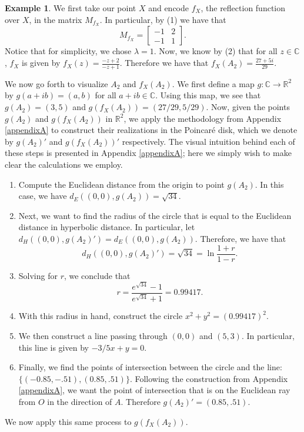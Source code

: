 \documentclass[12pt]{article}
\newcommand{\R}{\mathbb{R}}
\newcommand{\C}{\mathbb{C}}
\newcommand{\lftmat}[4]{\begin{bmatrix} {#1} & {#2} \\ {#3} & {#4} \end{bmatrix}}
\newcommand{\poincare}{Poincar\'{e} }
\theoremstyle{plain}
\theoremstyle{definition}
\newtheorem{example}[theorem]{Example}
\begin{document}
\begin{example}
We first take our point $X$ and encode $f_X$, the reflection function over $X$, in the matrix $M_{f_X}$. In particular, by (1) we have that 
\[M_{f_X} = \lftmat{-1}{2}{-1}{1}.\]
Notice that for simplicity, we chose $\lambda = 1$. Now, we know by (2) that for all $z \in \C$, $f_X$ is given by $f_X(z) = \frac{-z+2}{-z+1}$. Therefore we have that $f_X(A_2) = \frac{27+5i}{29}$. 

We now go forth to visualize $A_2$ and $f_X(A_2)$. We first define a map $g: \C \rightarrow \R^2$ by $g(a + ib) = (a, b)$ for all $a+ib \in \C$. Using this map, we see that $g(A_2) = (3,5)$ and $g(f_X(A_2)) = (27/29, 5/29)$. Now, given the points $g(A_2)$ and $g(f_X(A_2))$ in $\R^2$, we apply the methodology from Appendix \ref{appendixA} to construct their realizations in the \poincare disk, which we denote by $g(A_2)'$ and  $g(f_X(A_2))'$ respectively. The visual intuition behind each of these steps is presented in Appendix \ref{appendixA}; here we simply wish to make clear the calculations we employ. 

\begin{enumerate}
	\item Compute the Euclidean distance from the origin to point $g(A_2)$. In this case, we have $d_E((0,0),g(A_2)) = \sqrt{34}$.
	\item Next, we want to find the radius of the circle that is equal to the Euclidean distance in hyperbolic distance. In particular, let $d_H((0,0), g(A_2)') = d_E((0,0), g(A_2))$. Therefore, we have that
	\[
		d_H((0,0), g(A_2)') = \sqrt{34} = \ln\frac{1 + r}{1 - r}.
	\]
	\item Solving for $r$, we conclude that 
	\[
		r = \frac{e^{\sqrt{34}} - 1}{e^{\sqrt{34}} + 1} = 0.99417.
	\]
	\item With this radius in hand, construct the circle $x^2 + y^2 = (0.99417)^2$.
	\item We then construct a line passing through $(0,0)$ and $(5,3)$. In particular, this line is given by $-3/5x + y = 0$. 
	\item Finally, we find the points of intersection between the circle and the line: $\{(-0.85,-.51),(0.85,.51)\}$. Following the construction from Appendix \ref{appendixA}, we want the point of intersection that is on the Euclidean ray from $O$ in the direction of $A$. Therefore $g(A_2)' = (0.85, .51)$. 
\end{enumerate}

We now apply this same process to $g(f_X(A_2))$.


\end{example}
\end{document}
